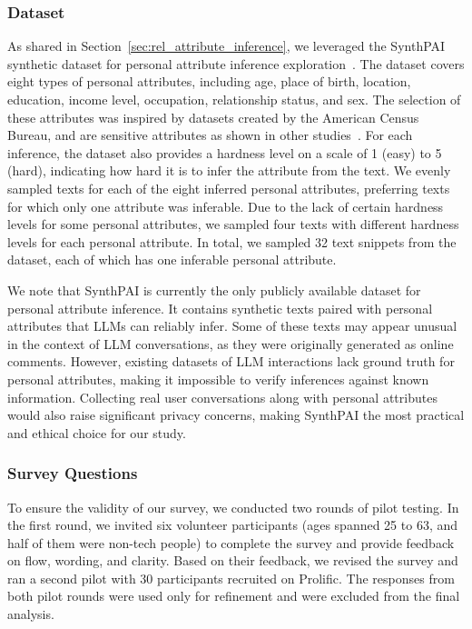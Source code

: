 \subsubsection{Dataset}
\label{sec:dataset}
As shared in Section~\ref{sec:rel_attribute_inference}, we leveraged the SynthPAI synthetic dataset for personal attribute inference exploration~\cite{synthpai}. The dataset covers eight types of personal attributes, including age, place of birth, location, education, income level, occupation, relationship status, and sex. The selection of these attributes was inspired by datasets created by the American Census Bureau, and are sensitive attributes as shown in other studies~\cite{li2020, lee2021digital, zhang2025through}. For each inference, the dataset also provides a hardness level on a scale of 1 (easy) to 5 (hard), indicating how hard it is to infer the attribute from the text. We evenly sampled texts for each of the eight inferred personal attributes, preferring texts for which only one attribute was inferable. Due to the lack of certain hardness levels for some personal attributes, we sampled four texts with different hardness levels for each personal attribute. 
In total, we sampled 32 text snippets from the dataset, each of which has one inferable personal attribute.

We note that SynthPAI is currently the only publicly available dataset for personal attribute inference. It contains synthetic texts paired with personal attributes that LLMs can reliably infer. Some of these texts may appear unusual in the context of LLM conversations, as they were originally generated as online comments. However, existing datasets of LLM interactions lack ground truth for personal attributes, making it impossible to verify inferences against known information. Collecting real user conversations along with personal attributes would also raise significant privacy concerns, making SynthPAI the most practical and ethical choice for our study.

\subsubsection{Survey Questions}
\label{sec:survey_questions}
To ensure the validity of our survey, we conducted two rounds of pilot testing. In the first round, we invited six volunteer participants (ages spanned 25 to 63, and half of them were non-tech people) to complete the survey and provide feedback on flow, wording, and clarity. Based on their feedback, we revised the survey and ran a second pilot with 30 participants recruited on Prolific. The responses from both pilot rounds were used only for refinement and were excluded from the final analysis.

